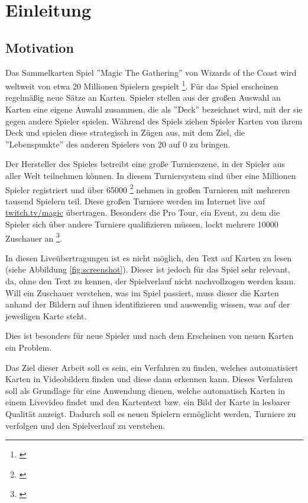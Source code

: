 \section{Einleitung}\raggedbottom 

\subsection{Motivation}

Das Sammelkarten Spiel ''Magic The Gathering'' von Wizards of the Coast wird weltweit von etwa 20 Millionen  Spielern gespielt \footnote{\cite{GuardianMagicReport}}. 
Für das Spiel erscheinen regelmäßig neue Sätze an Karten. Spieler stellen aus der großen Auswahl an Karten eine eigene Auwahl zusammen, die als ''Deck'' bezeichnet wird, mit der sie gegen andere Spieler spielen.
Während des Spiels ziehen Spieler Karten von ihrem Deck und spielen diese strategisch in Zügen aus, mit dem Ziel, die ''Lebenspunkte'' des anderen Spielers von 20 auf 0 zu bringen.

Der Hersteller des Spieles betreibt eine große Turnierszene, in der Spieler aus aller Welt teilnehmen können.
In diesem Turniersystem sind über eine Millionen Spieler registriert und über 65000 \footnote{\cite[~p.7]{HasbroQ1Financial}}  nehmen in großen Turnieren mit mehreren tausend Spielern teil.
Diese großen Turniere werden im Internet live auf \url{twitch.tv/magic} übertragen. Besonders die Pro Tour, ein Event, zu dem die Spieler sich über andere Turniere qualifizieren müssen, lockt mehrere 10000 Zuschauer an \footnote{\cite{TwitchStat}}.

In diesen Liveübertragungen ist es nicht möglich, den Text auf Karten zu lesen (siehe Abbildung \ref{fig:screenshot}). Dieser ist jedoch für das Spiel sehr relevant, da, ohne den Text zu kennen, der Spielverlauf nicht nachvollzogen werden kann. 
Will ein Zuschauer verstehen, was im Spiel passiert, muss dieser die Karten anhand der Bildern auf ihnen identifizieren und auswendig wissen, was auf der jeweiligen Karte steht.

Dies ist besonders für neue Spieler und nach dem Erscheinen von neuen Karten ein Problem. 

Das Ziel dieser Arbeit soll es sein, ein Verfahren zu finden, welches automatisiert Karten in Videobildern finden und diese dann erkennen kann.
Dieses Verfahren soll als Grundlage für eine Anwendung dienen, welche automatisch Karten in einem Livevideo findet und den Kartentext bzw. ein Bild der Karte in lesbarer Qualität anzeigt.
Dadurch soll es neuen Spielern ermöglicht werden, Turniere zu verfolgen und den Spielverlauf zu verstehen.

